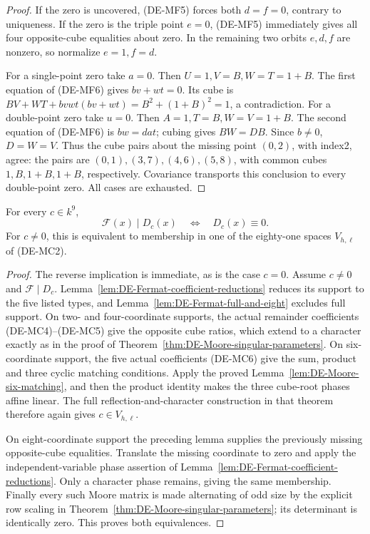 \begin{proof}
If the zero is uncovered, (DE-MF5) forces both \(d=f=0\),
contrary to uniqueness. If the zero is the triple point
\(e=0\), (DE-MF5) immediately gives all four opposite-cube
equalities about zero. In the remaining two orbits \(e,d,f\)
are nonzero, so normalize \(e=1,f=d\).

For a single-point zero take \(a=0\). Then
\(U=1,V=B,W=T=1+B\). The first equation of (DE-MF6)
gives \(bv+wt=0\). Its cube is
\(BV+WT+bvwt(bv+wt)=B^2+(1+B)^2=1\), a contradiction.
For a double-point zero take \(u=0\). Then
\(A=1,T=B,W=V=1+B\). The second equation of (DE-MF6)
is \(bw=dat\); cubing gives \(BW=DB\). Since \(b\ne0\),
\(D=W=V\). Thus the cube pairs about the missing point
\((0,2)\), with index2, agree: the pairs are
\((0,1),(3,7),(4,6),(5,8)\), with common cubes
\(1,B,1+B,1+B\), respectively. Covariance transports this
conclusion to every double-point zero. All cases are exhausted.
\end{proof}

\begin{theorem}
\label{thm:DE-Moore-Fermat-nondivisibility}
For every \(c\in k^9\),
\[
       \mathcal F(x)\mid D_c(x)
             \quad\Longleftrightarrow\quad D_c(x)\equiv0.
 \tag{DE-MF9}
\]
For \(c\ne0\), this is equivalent to membership in one of
the eighty-one spaces \(V_{h,\ell}\) of (DE-MC2).
\end{theorem}
\begin{proof}
The reverse implication is immediate, as is the case \(c=0\).
Assume \(c\ne0\) and \(\mathcal F\mid D_c\).
Lemma~\ref{lem:DE-Fermat-coefficient-reductions} reduces its
support to the five listed types, and
Lemma~\ref{lem:DE-Fermat-full-and-eight} excludes full support.
On two- and four-coordinate supports, the actual remainder
coefficients (DE-MC4)--(DE-MC5) give the opposite cube ratios,
which extend to a character exactly as in the proof of
Theorem~\ref{thm:DE-Moore-singular-parameters}.
On six-coordinate support, the five actual coefficients
(DE-MC6) give the sum, product and three cyclic matching
conditions. Apply the proved
Lemma~\ref{lem:DE-Moore-six-matching}, and then the product
identity makes the three cube-root phases affine linear.
The full reflection-and-character construction in that theorem
therefore again gives \(c\in V_{h,\ell}\).

On eight-coordinate support the preceding lemma supplies the
previously missing opposite-cube equalities. Translate the
missing coordinate to zero and apply the independent-variable
phase assertion of
Lemma~\ref{lem:DE-Fermat-coefficient-reductions}. Only a
character phase remains, giving the same membership.
Finally every such Moore matrix is made alternating of odd
size by the explicit row scaling in
Theorem~\ref{thm:DE-Moore-singular-parameters}; its determinant
is identically zero. This proves both equivalences.
\end{proof}

